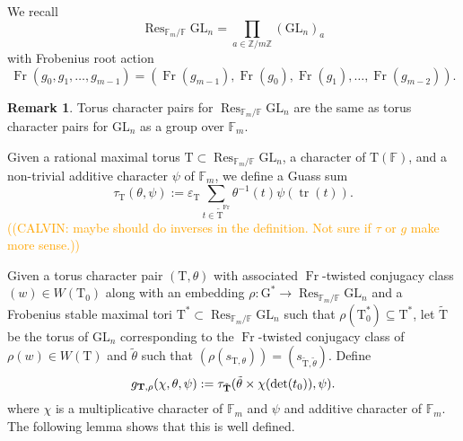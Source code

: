 \documentclass[12pt, reqno]{amsart}
\theoremstyle{definition}
\theoremstyle{definition}
\newtheorem{remark}[theorem]{Remark}
\theoremstyle{definition}
\newcommand{\trace}{\operatorname{tr}}
\newcommand{\GL}{\mathrm{GL}}
\newcommand{\finiteField}{\mathbb{F}}
\newcommand{\finiteFieldExtension}[1]{\finiteField_{#1}}
\newcommand{\Frobenius}{\operatorname{Fr}}
\newcommand{\restrictionOfScalars}[3]{\operatorname{Res}_{#1 \slash #2}{#3}}
\newcommand{\algebraicGroup}[1]{\boldsymbol{\mathrm{#1}}}
\newcommand{\calvin}[1]{\textcolor{orange}{\sffamily ((CALVIN: #1))}}
\begin{document}
We recall\[
	\restrictionOfScalars{\finiteFieldExtension{m}}{\finiteField}{\algebraicGroup{\GL}_n} = \prod_{a \in \mathbb{Z}/m\mathbb{Z}} \left(\algebraicGroup{\GL}_n\right)_a
\]
with Frobenius root action $$\Frobenius(g_0,g_1, \hdots, g_{m-1}) = (\Frobenius(g_{m-1}), \Frobenius(g_0), \Frobenius(g_1), \hdots, \Frobenius(g_{m-2})).$$

\begin{remark}
Torus character pairs for $\restrictionOfScalars{\finiteFieldExtension{m}}{\finiteField}{\algebraicGroup{\GL}_n}$ are the same as torus character pairs for $\algebraicGroup{\GL}_n$ as a group over $\finiteFieldExtension{m}$.
\end{remark}

Given a rational maximal torus $\algebraicGroup{T} \subset \restrictionOfScalars{\finiteFieldExtension{m}}{\finiteField}{\algebraicGroup{\GL}_n}$, a character of $\algebraicGroup{T}(\mathbb{F})$, and a non-trivial additive character $\psi$ of $\finiteFieldExtension{m}$, we define a Guass sum
\[
	\tau_{\algebraicGroup{T}}(\theta,\psi) := \varepsilon_{\algebraicGroup{
    \algebraicGroup{T}}}\sum_{t\in \tilde{\algebraicGroup{T}}^{\Frobenius}} \theta^{-1}(t)\psi(\trace(t)).
\]
\calvin{maybe should do inverses in the definition. Not sure if $\tau$ or $g$ make more sense.}

Given a torus character pair $(\algebraicGroup{T},\theta)$ with associated $\Frobenius$-twisted conjugacy class $(w) \in W(\algebraicGroup{T}_0)$ along with an embedding $\rho:\algebraicGroup{G}^* \to \restrictionOfScalars{\finiteFieldExtension{m}}{\finiteField}{\algebraicGroup{\GL}_n}$ and a Frobenius stable maximal tori $\algebraicGroup{T}^* \subset \restrictionOfScalars{\finiteFieldExtension{m}}{\finiteField}{\algebraicGroup{\GL}_n}$ such that $\rho(\algebraicGroup{T}_0^*) \subseteq \algebraicGroup{T}^*$, let $\tilde{\algebraicGroup{T}}$ be the torus of $\algebraicGroup{\GL}_n$ corresponding to the $\Frobenius$-twisted conjugacy class of $\rho(w) \in W(\algebraicGroup{T})$ and $\tilde{\theta}$ such that $(\rho(s_{\algebraicGroup{T},\theta})) = (s_{\tilde{\algebraicGroup{T}},\tilde{\theta}})$. Define
\[
    g_{\algebraicGroup{T},\rho}(\chi,\theta,\psi) := \tau_{\Tilde{\algebraicGroup{T}}}(\tilde{\theta} \times \chi(\det(t_0)),\psi).
\]
where $\chi$ is a multiplicative character of $\finiteFieldExtension{m}$ and $\psi$ and additive character of $\finiteFieldExtension{m}$.
The following lemma shows that this is well defined.
\end{document}
